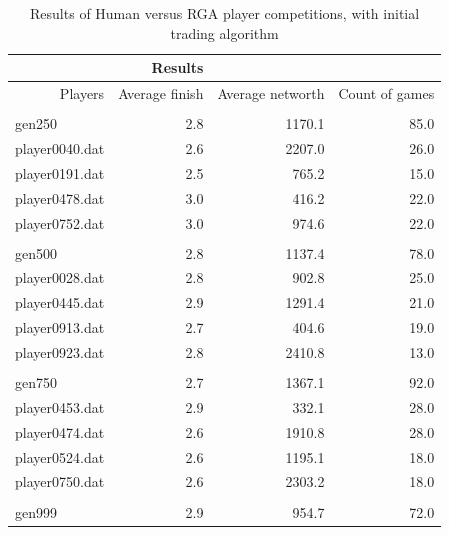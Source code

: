       \begin{table}[htbp]
        \centering
        \caption[Human versus RGA results, initial]{Results of Human versus RGA
        player competitions, with initial trading algorithm}
          \begin{tabular}{r|rrr}
          \toprule
                 & Results &        &  \\
          \midrule
          Players & Average finish & Average networth & Count of games
          \\ \\
          \multicolumn{1}{l|}{gen250} & 2.8    & 1170.1 & 85.0 \\
          \hline
          \multicolumn{1}{l|}{player0040.dat} & 2.6    & 2207.0 & 26.0 \\
          \multicolumn{1}{l|}{player0191.dat} & 2.5    & 765.2  & 15.0 \\
          \multicolumn{1}{l|}{player0478.dat} & 3.0    & 416.2  & 22.0 \\
          \multicolumn{1}{l|}{player0752.dat} & 3.0    & 974.6  & 22.0 \\ \\
          \multicolumn{1}{l|}{gen500} & 2.8    & 1137.4 & 78.0 \\
          \hline
          \multicolumn{1}{l|}{player0028.dat} & 2.8    & 902.8  & 25.0 \\
          \multicolumn{1}{l|}{player0445.dat} & 2.9    & 1291.4 & 21.0 \\
          \multicolumn{1}{l|}{player0913.dat} & 2.7    & 404.6  & 19.0 \\
          \multicolumn{1}{l|}{player0923.dat} & 2.8    & 2410.8 & 13.0 \\ \\
          \multicolumn{1}{l|}{gen750} & 2.7    & 1367.1 & 92.0 \\
          \hline
          \multicolumn{1}{l|}{player0453.dat} & 2.9    & 332.1  & 28.0 \\
          \multicolumn{1}{l|}{player0474.dat} & 2.6    & 1910.8 & 28.0 \\
          \multicolumn{1}{l|}{player0524.dat} & 2.6    & 1195.1 & 18.0 \\
          \multicolumn{1}{l|}{player0750.dat} & 2.6    & 2303.2 & 18.0 \\ \\
          \multicolumn{1}{l|}{gen999} & 2.9    & 954.7  & 72.0 \\

\end{tabular}
\end{table}
